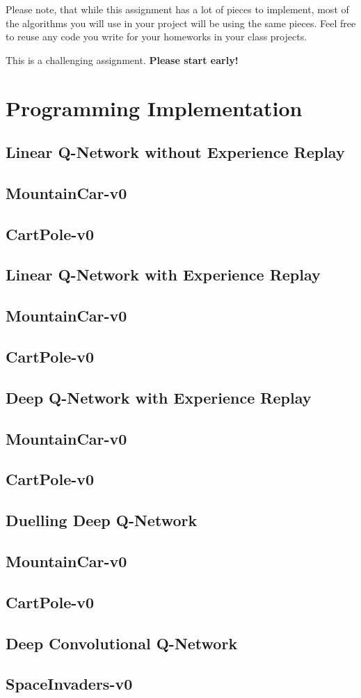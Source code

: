 \documentclass[12pt]{article}
\begin{document}
Please note, that while this assignment has a lot of pieces to implement, most of the algorithms you will use in your project will be using the same pieces. Feel free to reuse any code you write for your
homeworks in your class projects.


This is a challenging assignment. 
\textbf{Please start early!}

\pagebreak[4]

\section{Programming Implementation}
\subsection{Linear Q-Network without Experience Replay}
\subsection*{MountainCar-v0}
\subsection*{CartPole-v0}

\subsection{Linear Q-Network with Experience Replay}
\subsection*{MountainCar-v0}
\subsection*{CartPole-v0}

\subsection{Deep Q-Network with Experience Replay}
\subsection*{MountainCar-v0}
\subsection*{CartPole-v0}

\subsection{Duelling Deep Q-Network}
\subsection*{MountainCar-v0}
\subsection*{CartPole-v0}

\subsection{Deep Convolutional Q-Network}
\subsection*{SpaceInvaders-v0}

\pagebreak[4]

\nocite{*}


\end{document}
